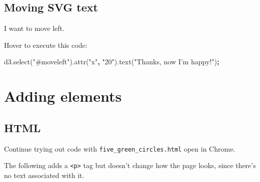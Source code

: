 \documentclass[openany]{book}
\newenvironment{Shaded}{\begin{snugshade}}{\end{snugshade}}
\newcommand{\AttributeTok}[1]{\textcolor[rgb]{0.77,0.63,0.00}{#1}}
\newcommand{\KeywordTok}[1]{\textcolor[rgb]{0.13,0.29,0.53}{\textbf{#1}}}
\newcommand{\NormalTok}[1]{#1}
\newcommand{\OperatorTok}[1]{\textcolor[rgb]{0.81,0.36,0.00}{\textbf{#1}}}
\newcommand{\OtherTok}[1]{\textcolor[rgb]{0.56,0.35,0.01}{#1}}
\newcommand{\StringTok}[1]{\textcolor[rgb]{0.31,0.60,0.02}{#1}}
\newcommand{\VariableTok}[1]{\textcolor[rgb]{0.00,0.00,0.00}{#1}}
\begin{document}
\hypertarget{moving-svg-text}{%
\subsection{Moving SVG text}\label{moving-svg-text}}

\begin{Shaded}
\end{Shaded}

I want to move left.

Hover to execute this code:

\hypertarget{move}{}
\begin{Shaded}
\begin{Highlighting}[]
\VariableTok{d3}\NormalTok{.}\AttributeTok{select}\NormalTok{(}\StringTok{"#moveleft"}\NormalTok{).}\AttributeTok{attr}\NormalTok{(}\StringTok{"x"}\OperatorTok{,} \StringTok{"20"}\NormalTok{).}\AttributeTok{text}\NormalTok{(}\StringTok{"Thanks, now I'm happy!"}\NormalTok{)}\OperatorTok{;}
\end{Highlighting}
\end{Shaded}

\hypertarget{adding-elements}{%
\section{Adding elements }\label{adding-elements}}

\hypertarget{html-1}{%
\subsection{HTML}\label{html-1}}

Continue trying out code with \texttt{five\_green\_circles.html} open in Chrome.

The following adds a \texttt{\textless{}p\textgreater{}} tag but doesn't change how the page looks, since there's no text associated with it.
\end{document}
